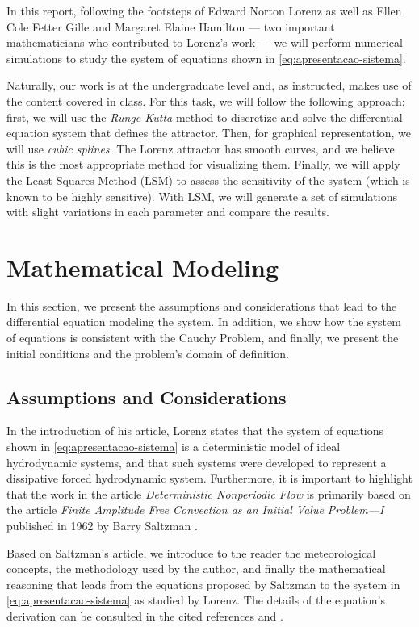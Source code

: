 \documentclass[12pt, a4paper]{article}
\begin{document}
In this report, following the footsteps of Edward Norton Lorenz as well as Ellen Cole Fetter Gille and Margaret Elaine Hamilton — two important mathematicians who contributed to Lorenz's work — we will perform numerical simulations to study the system of equations shown in \eqref{eq:apresentacao-sistema}.

Naturally, our work is at the undergraduate level and, as instructed, makes use of the content covered in class. For this task, we will follow the following approach: first, we will use the \textit{Runge-Kutta} method to discretize and solve the differential equation system that defines the attractor. Then, for graphical representation, we will use \textit{cubic splines}. The Lorenz attractor has smooth curves, and we believe this is the most appropriate method for visualizing them. Finally, we will apply the Least Squares Method (LSM) to assess the sensitivity of the system (which is known to be highly sensitive). With LSM, we will generate a set of simulations with slight variations in each parameter and compare the results.

    
\newpage
\section{Mathematical Modeling}

In this section, we present the assumptions and considerations that lead to the differential equation modeling the system. In addition, we show how the system of equations is consistent with the Cauchy Problem, and finally, we present the initial conditions and the problem's domain of definition.

\subsection{Assumptions and Considerations}

In the introduction of his article, Lorenz states that the system of equations shown in \eqref{eq:apresentacao-sistema} is a deterministic model of ideal hydrodynamic systems, and that such systems were developed to represent a dissipative forced hydrodynamic system. Furthermore, it is important to highlight that the work in the article \textit{Deterministic Nonperiodic Flow} \cite{Lorenz1963} is primarily based on the article \textit{Finite Amplitude Free Convection as an Initial Value Problem—I} published in 1962 by Barry Saltzman \cite{Saltzman1962}.

Based on Saltzman's article, we introduce to the reader the meteorological concepts, the methodology used by the author, and finally the mathematical reasoning that leads from the equations proposed by Saltzman to the system in \eqref{eq:apresentacao-sistema} as studied by Lorenz. The details of the equation's derivation can be consulted in the cited references \cite{Lorenz1963} and \cite{Saltzman1962}.
\end{document}
